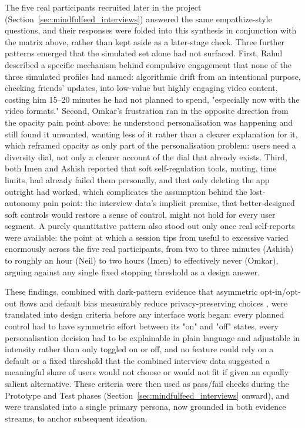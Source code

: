 \documentclass[11pt]{article}
\begin{document}
The five real participants recruited later in the project (Section~\ref{sec:mindfulfeed_interviews}) answered the same empathize-style questions, and their responses were folded into this synthesis in conjunction with the matrix above, rather than kept aside as a later-stage check. Three further patterns emerged that the simulated set alone had not surfaced. First, Rahul described a specific mechanism behind compulsive engagement that none of the three simulated profiles had named: algorithmic drift from an intentional purpose, checking friends' updates, into low-value but highly engaging video content, costing him 15--20 minutes he had not planned to spend, "especially now with the video formats." Second, Omkar's frustration ran in the opposite direction from the opacity pain point above: he understood personalisation was happening and still found it unwanted, wanting less of it rather than a clearer explanation for it, which reframed opacity as only part of the personalisation problem: users need a diversity dial, not only a clearer account of the dial that already exists. Third, both Imen and Ashish reported that soft self-regulation tools, muting, time limits, had already failed them personally, and that only deleting the app outright had worked, which complicates the assumption behind the lost-autonomy pain point: the interview data's implicit premise, that better-designed soft controls would restore a sense of control, might not hold for every user segment. A purely quantitative pattern also stood out only once real self-reports were available: the point at which a session tips from useful to excessive varied enormously across the five real participants, from two to three minutes (Ashish) to roughly an hour (Neil) to two hours (Imen) to effectively never (Omkar), arguing against any single fixed stopping threshold as a design answer.

These findings, combined with dark-pattern evidence that asymmetric opt-in/opt-out flows and default bias measurably reduce privacy-preserving choices \parencites[2]{4807303}, were translated into design criteria before any interface work began: every planned control had to have symmetric effort between its "on" and "off" states, every personalisation decision had to be explainable in plain language and adjustable in intensity rather than only toggled on or off, and no feature could rely on a default or a fixed threshold that the combined interview data suggested a meaningful share of users would not choose or would not fit if given an equally salient alternative. These criteria were then used as pass/fail checks during the Prototype and Test phases (Section~\ref{sec:mindfulfeed_interviews} onward), and were translated into a single primary persona, now grounded in both evidence streams, to anchor subsequent ideation.
\end{document}
